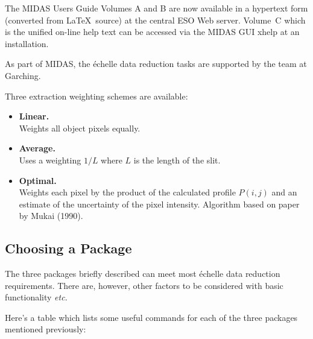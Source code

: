 The MIDAS Users Guide Volumes A and B are now available in a hypertext
form (converted from \LaTeX\ source) at the central ESO Web server.
Volume~C which is the unified on-line help text can be accessed via the
MIDAS GUI xhelp at an installation.

As part of MIDAS, the \'{e}chelle data reduction tasks are supported by the
team at Garching.

Three extraction weighting schemes are available:

\begin{itemize}

\item {\bf{Linear.}} \mbox{}\\
      Weights all object pixels equally.

\item {\bf{Average.}} \mbox{}\\
      Uses a weighting $1/L$ where $L$ is the length of the slit.

\item {\bf{Optimal.}} \mbox{}\\
      Weights each pixel by the product of the calculated profile
      $P(i,j)$ and an estimate of the uncertainty of the pixel intensity.
      Algorithm based on paper by Mukai (1990)\@.

\end{itemize}


\subsection{\label{se_pack_sel}Choosing a Package}

The three packages briefly described  can meet
most \'{e}chelle data reduction requirements.  There are, however, other
factors to be considered with basic functionality {\em etc.}

Here's a table which lists some useful commands for each of the three
packages mentioned previously:

